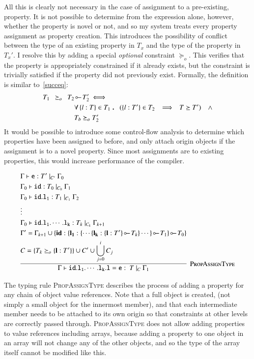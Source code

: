 \documentclass[12pt,a4paper,twoside,openright]{report}
\theoremstyle{definition}
\theoremstyle{dotless}
\newcommand*{\orig}{\ensuremath{\!\multimapinv\!}}
\newcommand\qdot{\mathbin{\scalebox{1.5}{.}}\enspace}
\begin{document}
All this is clearly not necessary in the case
of assignment to a pre-existing, property. It is not
possible to determine from the expression alone, however, whether the property
is novel or not, and so my system treats every property assignment as 
property creation. This introduces the possibility of conflict between the type
of an existing property in $T_x$ and the type of the property in $T_x'$. I resolve this
by adding a special \textit{optional} constraint $\succeq_o$. This verifies
that the property is appropriately constrained if it already exists, but the constraint
is trivially satisfied if the property did not previously exist. Formally, the definition
is similar to~\ref{succeq}:
\begin{equation}
  \begin{split}
	T_1\enspace \succeq_o\enspace T_2&\orig T_2' \iff \\
	& \forall \left\{l: T\right\} \in T_1 \qdot (\{l: T'\}\in T_2\enspace \implies \enspace T \succeq T') \quad\land \\
	& T_b \succeq_o T_2'
  \end{split}
  \label{succeqo}
\end{equation}
It would be possible to introduce some control-flow analysis to determine which 
properties have been assigned to before, and only attach origin objects if the
assignment is to a novel property. Since most assignments are to existing 
properties, this would increase performance of the compiler.

$$\infer[\textsc{PropAssignType}]{
  \Gamma\vdash\mathtt{id.l_1.\cdots.l_k.l = e}:\ T\ |_C\ \Gamma_1
}{
  \begin{split}
	&\Gamma\vdash\mathtt{e}:T'\ |_{C'}\ \Gamma_0 \\
	&\Gamma_0\vdash\mathtt{id}:T_0\ |_{C_0}\ \Gamma_1 \\
	&\Gamma_0\vdash\mathtt{id.l_1}:T_1\ |_{C_1}\ \Gamma_2 \\
	&\vdots \\
	&\Gamma_0\vdash\mathtt{id.l_1.\cdots.l_k}:T_k\ |_{C_k}\ \Gamma_{k+1} \\
	&\Gamma' = \Gamma_{k+1}\cup\{\textbf{id}: \{ \mathbf{l_1}: \{\cdots \{\mathbf{l_k}:\{\mathbf{l}: T'\}\orig T_k \} \cdots\} \orig T_1\}\orig T_0\} \\
	&C = \{T_k \succeq_o \{\mathbf{l}:T'\}\} \cup C' \cup \bigcup_{j=0}^{i}{C_j}
  \end{split}
}$$

The typing rule \textsc{PropAssignType} describes the process of adding a
property for any chain of object value references. Note that a full object is
created, (not simply a small object for the innermost member), and that each
intermediate member needs to be attached to its own origin so that constraints
at other levels are correctly passed through. \textsc{PropAssignType} does not
allow adding properties to value references including arrays, because
adding a property to one object in an array will not change any of the other
objects, and so the type of the array itself cannot be modified like this.
\end{document}
